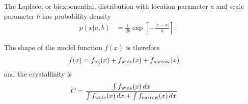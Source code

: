 \documentclass[a4paper, 12pt]{article}
\begin{document}
The Laplace, or biexponential, distribution with location parameter $a$ and
scale parameter $b$ has probability density
\begin{align}
p(x | a, b) &= \frac{1}{2b}\exp\left[-\frac{|x - a|}{b}\right].
\end{align}


The shape of the model function $f(x)$ is therefore
\begin{align}
f(x) &= f_{\rm bg}(x) + f_{\rm wide}(x) + f_{\rm narrow}(x)
\end{align}
and the crystallinity is
\begin{align}
C &= \frac{\int f_{\rm wide}(x) \, dx}
          {\int f_{\rm wide}(x) \, dx + \int f_{\rm narrow}(x) \, dx}
\end{align}




\end{document}
